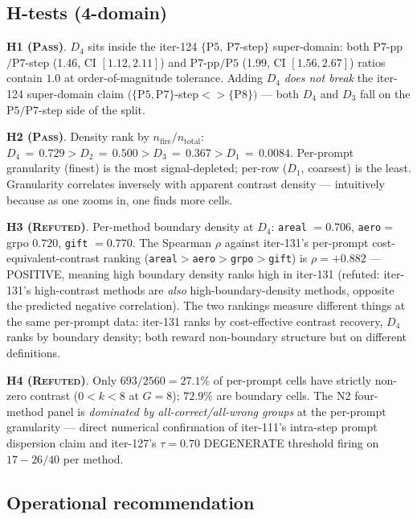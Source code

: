 \documentclass{article}
\begin{document}
\subsection{H-tests (4-domain)}

\textbf{H1 (\textsc{Pass})}. $D_4$ sits inside the iter-124
$\{\mathrm{P5},\,\mathrm{P7}$-step$\}$ super-domain: both
$\mathrm{P7}$-pp$/\mathrm{P7}$-step (1.46, CI $[1.12,2.11]$) and
$\mathrm{P7}$-pp$/\mathrm{P5}$ (1.99, CI $[1.56,2.67]$) ratios
contain $1.0$ at order-of-magnitude tolerance. Adding
$D_4$ \emph{does not break} the iter-124 super-domain claim
$(\{\mathrm{P5},\mathrm{P7}\}$-step$<\!\!> \{\mathrm{P8}\})$ — both
$D_4$ and $D_3$ fall on the $\mathrm{P5}/\mathrm{P7}$-step side of
the split.

\textbf{H2 (\textsc{Pass})}. Density rank by $n_{\mathrm{fire}} /
n_{\mathrm{total}}$: $D_4 \,=\, 0.729 > D_2 \,=\, 0.500 > D_3 \,=\,
0.367 > D_1 \,=\, 0.0084$. Per-prompt granularity (finest) is the
most signal-depleted; per-row ($D_1$, coarsest) is the least.
Granularity correlates inversely with apparent contrast density —
intuitively because as one zooms in, one finds more cells.

\textbf{H3 (\textsc{Refuted})}. Per-method boundary density at
$D_4$: \texttt{areal} $= 0.706$, \texttt{aero}${}={}$grpo
$0.720$, \texttt{gift} $= 0.770$. The Spearman $\rho$ against
iter-131's per-prompt cost-equivalent-contrast ranking
(\texttt{areal}${}>$\texttt{aero}${}>$\texttt{grpo}${}>$\texttt{gift})
is $\rho = +0.882$ — POSITIVE, meaning high boundary density ranks
high in iter-131 (refuted: iter-131's high-contrast methods are
\emph{also} high-boundary-density methods, opposite the predicted
negative correlation). The two rankings measure different things at
the same per-prompt data: iter-131 ranks by cost-effective contrast
recovery, $D_4$ ranks by boundary density; both reward
non-boundary structure but on different definitions.

\textbf{H4 (\textsc{Refuted})}. Only $693 / 2560 = 27.1\%$ of
per-prompt cells have strictly non-zero contrast ($0 < k < 8$ at
$G{=}8$); $72.9\%$ are boundary cells. The N2 four-method panel is
\emph{dominated by all-correct/all-wrong groups} at the per-prompt
granularity — direct numerical confirmation of iter-111's
intra-step prompt dispersion claim and iter-127's $\tau{=}0.70$
DEGENERATE threshold firing on $17{-}26/40$ per method.

\subsection{Operational recommendation}
\end{document}
